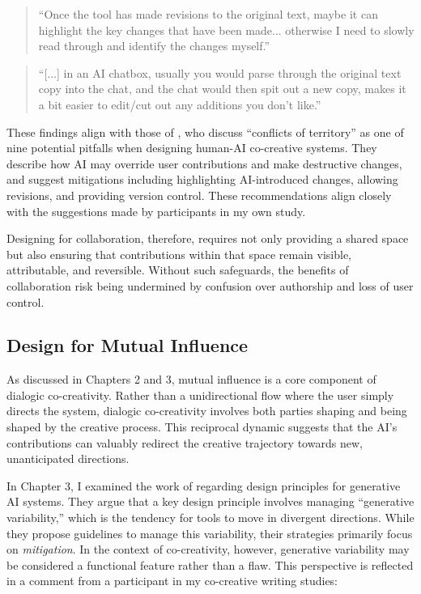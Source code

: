 \begin{quote}
``Once the tool has made revisions to the original text, maybe it can highlight the key changes that have been made... otherwise I need to slowly read through and identify the changes myself.''
\end{quote}

\begin{quote}
``[...] in an AI chatbox, usually you would parse through the original text copy into the chat, and the chat would then spit out a new copy, makes it a bit easier to edit/cut out any additions you don't like.''
\end{quote}

These findings align with those of \citet{Buschek2021-ks}, who discuss ``conflicts of territory'' as one of nine potential pitfalls when designing human-AI co-creative systems. They describe how AI may override user contributions and make destructive changes, and suggest mitigations including highlighting AI-introduced changes, allowing revisions, and providing version control. These recommendations align closely with the suggestions made by participants in my own study.

Designing for collaboration, therefore, requires not only providing a shared space but also ensuring that contributions within that space remain visible, attributable, and reversible. Without such safeguards, the benefits of collaboration risk being undermined by confusion over authorship and loss of user control.

\subsection{Design for Mutual Influence}

As discussed in Chapters 2 and 3, mutual influence is a core component of dialogic co-creativity. Rather than a unidirectional flow where the user simply directs the system, dialogic co-creativity involves both parties shaping and being shaped by the creative process. This reciprocal dynamic suggests that the AI's contributions can valuably redirect the creative trajectory towards new, unanticipated directions.

In Chapter 3, I examined the work of \citet{Weisz2024-io} regarding design principles for generative AI systems. They argue that a key design principle involves managing ``generative variability,'' which is the tendency for tools to move in divergent directions. While they propose guidelines to manage this variability, their strategies primarily focus on \textit{mitigation}. In the context of co-creativity, however, generative variability may be considered a functional feature rather than a flaw. This perspective is reflected in a comment from a participant in my co-creative writing studies:

